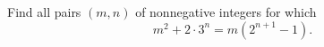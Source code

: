 Find all pairs $(m,n)$ of nonnegative integers for which
\[
m^2 + 2 \cdot 3^n = m\left(2^{n+1} - 1\right).
\]
